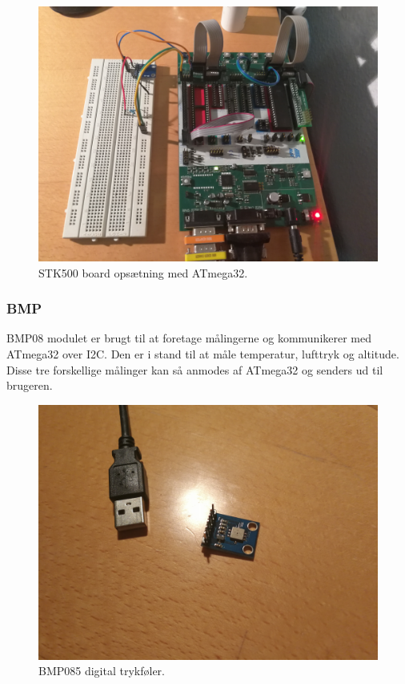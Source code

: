 \begin{figure}[h]
	\centering
	\includegraphics[width=0.7\linewidth]{figs/device_atmega32.jpg}
	\caption{STK500 board opsætning med ATmega32.}
	\label{fig:deviceatmege32}
\end{figure}

\subsubsection{BMP}
BMP08 modulet er brugt til at foretage målingerne og kommunikerer med ATmega32 over I2C. Den er i stand til at måle temperatur, lufttryk og altitude. Disse tre forskellige målinger kan så anmodes af ATmega32 og senders ud til brugeren.

\begin{figure}[h]
	\centering
	\includegraphics[width=0.7\linewidth]{figs/device_bmp.jpg}
	\caption{BMP085 digital trykføler.}
	\label{fig:devicebmp}
\end{figure}
